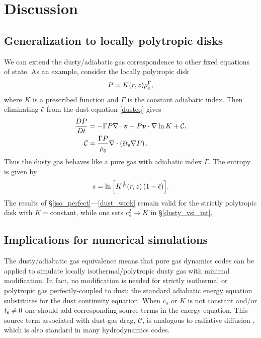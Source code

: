 \section{Discussion}\label{discussion}

\subsection{Generalization to locally polytropic disks}
We can extend the dusty/adiabatic gas correspondence to 
other fixed equations of state. As an example, consider the locally
polytropic disk 
\begin{align}
  P = K(r,z)\rho_\mathrm{g}^{\Gamma}, 
\end{align}
where $K$ is a prescribed function and $\Gamma$ is the constant
adiabatic index. Then eliminating $\tilde{\epsilon}$ from the dust equation
\ref{dusteq} gives 
\begin{align}\label{poly_energy}
  \frac{D P}{D t} &= - \Gamma P\nabla\cdot\bm{v}  + P \bm{v}\cdot\nabla
  \ln{K} + \mathcal{C},\\
  \mathcal{C}& = \frac{\Gamma P}{\rho_\mathrm{g}}\nabla\cdot\left(\tilde{\epsilon}t_\mathrm{s}\nabla
  P\right).
\end{align}
Thus the dusty gas behaves like a pure gas with adiabatic index
$\Gamma$. The entropy is given by 
\begin{align}
  s = \ln{\left[K^\frac{1}{\Gamma}(r,z)\left(1 - \tilde{\epsilon}\right)\right]}.  
\end{align}
The results of \S\ref{iso_perfect}---\ref{dust_work} remain valid for the strictly 
polytropic disk with $K=$constant, while one sets $c_s^2\to K$ in
\S\ref{dusty_vsi_int}. 

\subsection{Implications for numerical simulations}
The dusty/adiabatic gas equivalence means that pure
gas dynamics codes can be applied to simulate locally
isothermal/polytropic dusty gas with minimal modification. In fact, no
modification is needed  
for strictly isothermal or polytropic gas perfectly-coupled to dust:  
the standard adiabatic energy equation substitutes for the dust continuity
equation. When $c_s$ or $K$ is not constant and/or $t_\mathrm{s}\neq0$ one
should add corresponding source terms in the energy equation. 
This source term associated with dust-gas drag, $\mathcal{C}$, is 
analogous to radiative diffusion \citep{price15}, which is also
standard in many hydrodynamics codes.      

